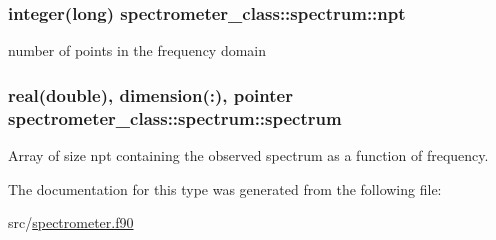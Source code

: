 \hypertarget{structspectrometer__class_1_1spectrum_a082d9e0f82565526a83b32fae38df78f}{
\subsubsection[{npt}]{\setlength{\rightskip}{0pt plus 5cm}integer(long) spectrometer\+\_\+class\+::spectrum\+::npt\hspace{0.3cm}{\ttfamily [private]}}}\label{structspectrometer__class_1_1spectrum_a082d9e0f82565526a83b32fae38df78f}


number of points in the frequency domain 

\hypertarget{structspectrometer__class_1_1spectrum_a9f42df4722fd9d17f514de0dbe1a50da}{
\subsubsection[{spectrum}]{\setlength{\rightskip}{0pt plus 5cm}real(double), dimension(\+:), pointer spectrometer\+\_\+class\+::spectrum\+::spectrum\hspace{0.3cm}{\ttfamily [private]}}}\label{structspectrometer__class_1_1spectrum_a9f42df4722fd9d17f514de0dbe1a50da}


Array of size npt containing the observed spectrum as a function of frequency. 



The documentation for this type was generated from the following file\+:\begin{DoxyCompactItemize}
\item 
src/\hyperlink{spectrometer_8f90}{spectrometer.\+f90}\end{DoxyCompactItemize}
